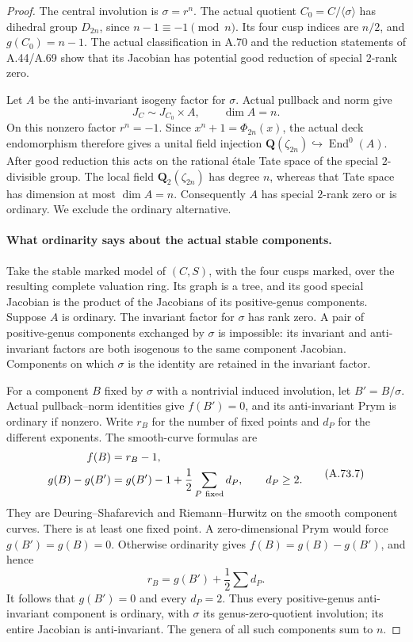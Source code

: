 \begin{proof}
The central involution is \(\sigma=r^n\). The actual
quotient \(C_0=C/\langle\sigma\rangle\) has dihedral
group \(D_{2n}\), since \(n-1\equiv-1\pmod n\).
Its four cusp indices are \(n/2\), and \(g(C_0)=n-1\).
The actual classification in A.70 and the reduction statements
of A.44/A.69 show that its Jacobian has potential good
reduction of special \(2\)-rank zero.

Let \(A\) be the anti-invariant isogeny factor for
\(\sigma\). Actual pullback and norm give
\[
                J_C\sim J_{C_0}\times A,
                \qquad \dim A=n.
                                                        \tag{A.73.6}
\]
On this nonzero factor \(r^n=-1\). Since
\(x^n+1=\Phi_{2n}(x)\), the actual deck endomorphism
therefore gives a unital field injection
\(\mathbf Q(\zeta_{2n})\hookrightarrow\operatorname{End}^0(A)\).
After good reduction this acts on the rational \'{e}tale
Tate space of the special \(2\)-divisible group. The local
field \(\mathbf Q_2(\zeta_{2n})\) has degree \(n\),
whereas that Tate space has dimension at most \(\dim A=n\).
Consequently \(A\) has special \(2\)-rank zero or is ordinary.
We exclude the ordinary alternative.

\paragraph{What ordinarity says about the actual stable components.}
Take the stable marked model of \((C,S)\), with the four
cusps marked, over the resulting complete valuation ring.
Its graph is a tree, and its good special Jacobian is the
product of the Jacobians of its positive-genus components.
Suppose \(A\) is ordinary. The invariant factor for
\(\sigma\) has rank zero. A pair of positive-genus components
exchanged by \(\sigma\) is impossible: its invariant and
anti-invariant factors are both isogenous to the same
component Jacobian. Components on which \(\sigma\) is
the identity are retained in the invariant factor.

For a component \(B\) fixed by \(\sigma\) with a
nontrivial induced involution, let \(B'=B/\sigma\).
Actual pullback--norm identities give \(f(B')=0\), and
its anti-invariant Prym is ordinary if nonzero. Write
\(r_B\) for the number of fixed points and \(d_P\) for
the different exponents. The smooth-curve formulas are
\[
 \begin{aligned}
 f(B)&=r_B-1,\\
 g(B)-g(B')&=g(B')-1+\frac12\sum_{P\ {\rm fixed}}d_P,
                   \qquad d_P\ge2.
 \end{aligned}                                         \tag{A.73.7}
\]
They are Deuring--Shafarevich and Riemann--Hurwitz on the
smooth component curves.
\cite[Corollary 1.8]{fghCrew1984}
\cite[Proposition 1.4]{fghYang2024}
There is at least one fixed point. A zero-dimensional Prym
would force \(g(B')=g(B)=0\). Otherwise ordinarity gives
\(f(B)=g(B)-g(B')\), and hence
\[
                    r_B=g(B')+\frac12\sum d_P.
\]
It follows that \(g(B')=0\) and every \(d_P=2\).
Thus every positive-genus anti-invariant component is
ordinary, with \(\sigma\) its genus-zero-quotient involution;
its entire Jacobian is anti-invariant. The genera of all such
components sum to \(n\).


\end{proof}
